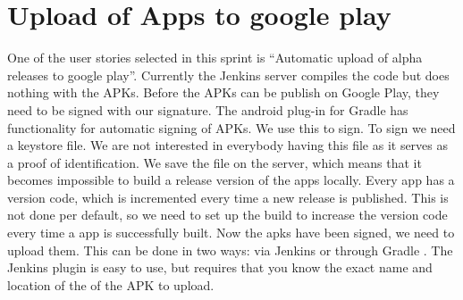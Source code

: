 \chapter{Upload of Apps to google play}
One of the user stories selected in this sprint is ``Automatic upload of alpha releases to google play''. Currently the Jenkins server compiles the code but does nothing with the APKs. Before the APKs can be publish on Google Play, they need to be signed with our signature. The android plug-in for Gradle has functionality for automatic signing of APKs. We use this to sign. To sign we need a keystore file. We are not interested in everybody having this file as it serves as a proof of identification. We save the file on the server, which means that it becomes impossible to build a release version of the apps locally.
Every app has a version code, which is incremented every time a new release is published. This is not done per default, so we need to set up the build to increase the version code every time a app is successfully built. 
Now the apks have been signed, we need to upload them. This can be done in two ways: via Jenkins \parencite{jenkins-play-plugin} or through Gradle \parencite{gradle-play-plugin}. The Jenkins plugin is easy to use, but requires that you know the exact name and location of the of the APK to upload.
